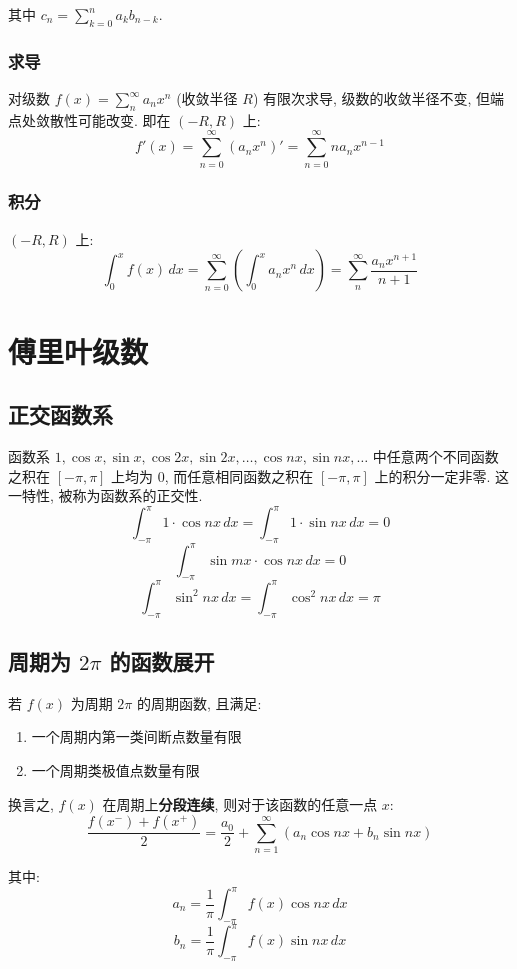 \documentclass[UTF8]{ctexart}
\begin{document}
其中 $\displaystyle c_n = \sum_{k = 0}^{n} a_k b_{n - k} $.

\subsubsection{求导}
对级数 $\displaystyle f(x) = \sum_{n}^{\infty} a_n x^n $ (收敛半径 $ R $) 有限次求导, 级数的收敛半径不变, 但端点处敛散性可能改变. 即在 $ (-R, R) $ 上:
\[ f'(x) = \sum_{n = 0}^{\infty} (a_n x^n)' = \sum_{n = 0}^{\infty} n a_n x^{n - 1} \]



\subsubsection{积分}
$ (-R, R) $ 上:
\[ \int_0^x f(x) \,dx = \sum_{n = 0}^{\infty}\left( \int_0^x a_n x^n \,dx \right) = \sum_{n}^{\infty} \dfrac{a_n x^{n+1}}{n + 1} \]


\newpage
\section{傅里叶级数}
\subsection{正交函数系}
函数系 $ 1, \cos x, \sin x, \cos 2x, \sin 2x, \dots, \cos nx, \sin nx, \dots $ 中任意两个不同函数之积在 $ [-\pi, \pi] $ 上均为 $ 0 $, 而任意相同函数之积在 $ [-\pi, \pi] $ 上的积分一定非零. 这一特性, 被称为函数系的正交性. 
\[ \int_{- \pi}^\pi 1 \cdot \cos nx \,dx = \int_{- \pi}^\pi 1 \cdot \sin nx \,dx = 0 \]
\[ \int_{- \pi}^\pi \sin mx \cdot \cos nx \,dx = 0 \]
\[ \int_{- \pi}^\pi \sin^2 nx \,dx = \int_{- \pi}^\pi \cos^2 nx \,dx = \pi \]

\subsection{周期为 $ 2 \pi $ 的函数展开}
若 $ f(x) $ 为周期 $ 2 \pi $ 的周期函数, 且满足:
\begin{enumerate}
    \item 一个周期内第一类间断点数量有限
    \item 一个周期类极值点数量有限
\end{enumerate}
换言之, $ f(x) $ 在周期上\textbf{分段连续}, 则对于该函数的任意一点 $ x $:
\[ \dfrac{f(x^-) + f(x^+)}{2} = \dfrac{a_0}{2} + \sum_{n = 1}^{\infty} (a_n \cos nx + b_n \sin nx) \]

其中:
\[ a_n = \dfrac{1}{\pi} \int_{-\pi}^\pi f(x) \cos nx \,dx\]
\[ b_n = \dfrac{1}{\pi} \int_{-\pi}^\pi f(x) \sin nx \,dx\]
\end{document}
